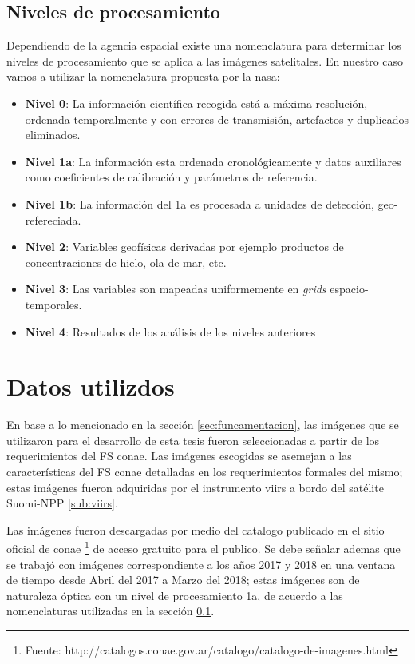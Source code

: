 \subsection{Niveles de procesamiento}\label{sub:nivelesdeprocesamiento}
Dependiendo de la agencia espacial existe una nomenclatura para determinar los niveles de procesamiento que se aplica a las imágenes satelitales. En nuestro caso vamos a utilizar la nomenclatura propuesta por la \ac{nasa}:
\begin{itemize}
	\item \textbf{Nivel 0}: La información científica recogida está a máxima resolución, ordenada temporalmente y con errores de transmisión, artefactos y duplicados eliminados.
 	\item \textbf{Nivel 1a}: La información esta ordenada cronológicamente y datos auxiliares como coeficientes de calibración y parámetros de referencia.
 	\item \textbf{Nivel 1b}: La información del 1a es procesada a unidades de detección, geo-refereciada.
 	\item \textbf{Nivel 2}: Variables geofísicas derivadas por ejemplo productos de concentraciones de hielo, ola de mar, etc.
 	\item \textbf{Nivel 3}: Las variables son mapeadas uniformemente en \textit{grids} espacio-temporales.
 	\item \textbf{Nivel 4}: Resultados de los análisis de los niveles anteriores
\end{itemize}


\section{Datos utilizdos}\label{sec:datosutilizados}

En base a lo mencionado en la sección \ref{sec:funcamentacion}, las imágenes que se utilizaron para el desarrollo de esta tesis fueron seleccionadas a partir de los requerimientos del \ac{FS} \ac{conae}. Las imágenes escogidas se asemejan a las características del \ac{FS} \ac{conae} detalladas en los requerimientos formales del mismo; estas imágenes fueron adquiridas por el instrumento \ac{viirs} a bordo del satélite Suomi-NPP \ref{sub:viirs}.

Las imágenes fueron descargadas por medio del catalogo  publicado en el sitio oficial de \ac{conae} \footnote{Fuente: http://catalogos.conae.gov.ar/catalogo/catalogo-de-imagenes.html} de acceso gratuito para el publico. Se debe señalar ademas que se trabajó con imágenes correspondiente a los años 2017 y 2018 en una ventana de tiempo desde Abril del 2017 a Marzo del 2018; estas imágenes son de naturaleza óptica con un nivel de procesamiento 1a, de acuerdo a las nomenclaturas utilizadas en la sección \ref{sub:nivelesdeprocesamiento}.

